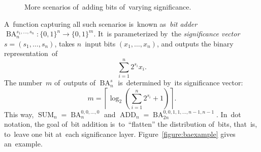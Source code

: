 \documentclass[sigconf, review, anonymous]{acmart}
\DeclareMathOperator{\SUM}{SUM}
\DeclareMathOperator{\ADD}{ADD}
\DeclareMathOperator{\BA}{BA}
\begin{document}
\begin{figure}%
	\begin{center}
	\end{center}
	\caption{More scenarios of~adding bits of~varying significance.}
	\label{figure:dot2}
\end{figure}

A~function capturing all such scenarios is~known as~\emph{bit adder}
$\BA_n^{s_1, \dotsc, s_n} \colon \{0,1\}^n \to \{0,1\}^m$. It~is parameterized by~the \emph{significance vector}
$s=(s_1, \dotsc, s_n)$, takes $n$~input bits $(x_1, \dotsc, x_n)$, and outputs
the binary representation~of
\[\sum_{i=1}^{n}2^{s_i}x_i.\]
The number~$m$ of~outputs of $\BA_n^s$ is~determined by~its significance vector:
\[m=\left\lceil \log_2\left( \sum_{i=1}^{n}2^{s_i} + 1\right) \right\rceil.\]
This way, $\SUM_n=\BA^{0,0,\dotsc,0}_n$ and $\ADD_n=\BA^{0,0,1,1,\dotsc,n-1,n-1}_{2n}$.
In~dot notation, the goal of~bit addition is~to~``flatten''
the distribution of~bits, that~is, to~leave one bit at~each significance layer.
Figure~\ref{figure:baexample} gives an~example.
\end{document}
